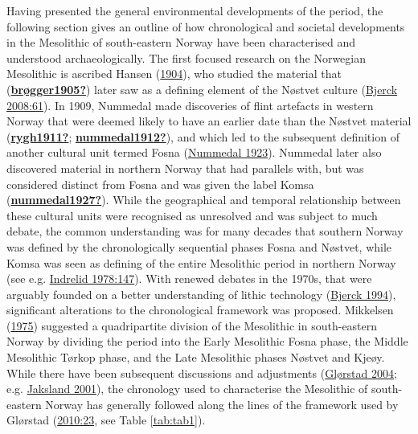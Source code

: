 \documentclass[
  a4paper,
  oneside]{uiophdthesis}
\begin{document}
Having presented the general environmental developments of the period, the following section gives an outline of how chronological and societal developments in the Mesolithic of south-eastern Norway have been characterised and understood archaeologically. The first focused research on the Norwegian Mesolithic is ascribed Hansen (\protect\hyperlink{ref-hansen1904}{1904}), who studied the material that (\protect\hyperlink{ref-bruxf8gger1905}{\textbf{brøgger1905?}}) later saw as a defining element of the Nøstvet culture (\protect\hyperlink{ref-bjerck2008}{Bjerck 2008:61}). In 1909, Nummedal made discoveries of flint artefacts in western Norway that were deemed likely to have an earlier date than the Nøstvet material (\protect\hyperlink{ref-rygh1911}{\textbf{rygh1911?}}; \protect\hyperlink{ref-nummedal1912}{\textbf{nummedal1912?}}), and which led to the subsequent definition of another cultural unit termed Fosna (\protect\hyperlink{ref-nummedal1923}{Nummedal 1923}). Nummedal later also discovered material in northern Norway that had parallels with, but was considered distinct from Fosna and was given the label Komsa (\protect\hyperlink{ref-nummedal1927}{\textbf{nummedal1927?}}). While the geographical and temporal relationship between these cultural units were recognised as unresolved and was subject to much debate, the common understanding was for many decades that southern Norway was defined by the chronologically sequential phases Fosna and Nøstvet, while Komsa was seen as defining of the entire Mesolithic period in northern Norway (see e.g. \protect\hyperlink{ref-indrelid1978}{Indrelid 1978:147}). With renewed debates in the 1970s, that were arguably founded on a better understanding of lithic technology (\protect\hyperlink{ref-bjerck1994}{Bjerck 1994}), significant alterations to the chronological framework was proposed. Mikkelsen (\protect\hyperlink{ref-mikkelsen1975}{1975}) suggested a quadripartite division of the Mesolithic in south-eastern Norway by dividing the period into the Early Mesolithic Fosna phase, the Middle Mesolithic Tørkop phase, and the Late Mesolithic phases Nøstvet and Kjeøy. While there have been subsequent discussions and adjustments (\protect\hyperlink{ref-gluxf8rstad2004}{Glørstad 2004}; e.g. \protect\hyperlink{ref-jaksland2001}{Jaksland 2001}), the chronology used to characterise the Mesolithic of south-eastern Norway has generally followed along the lines of the framework used by Glørstad (\protect\hyperlink{ref-glorstad2010}{2010:23}, see Table \ref{tab:tab1}).
\end{document}
